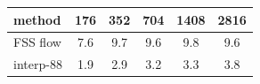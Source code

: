 \begin{tabular}{lccccc}
\toprule
method & 176 & 352 & 704 & 1408 & 2816 \\
\midrule
FSS flow & 7.6 & 9.7 & 9.6 & 9.8 & 9.6 \\
interp-88 & 1.9 & 2.9 & 3.2 & 3.3 & 3.8 \\
\bottomrule
\end{tabular}
